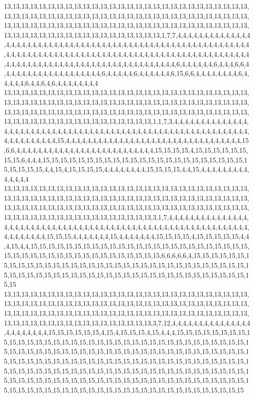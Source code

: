 13,13,13,13,13,13,13,13,13,13,13,13,13,13,13,13,13,13,13,13,13,13,13,13,13,13,13,13,13,13,13,13,13,13,13,13,13,13,13,13,13,13,13,13,13,13,13,13,13,13,13,13,13,13,13,13,13,13,13,13,13,13,13,13,13,13,13,13,13,13,13,13,13,13,13,13,13,13,13,13,13,13,13,13,13,13,13,13,13,13,13,13,13,13,13,13,13,13,13,13,13,13,1,7,7,4,4,4,4,4,4,4,4,4,4,4,4,4,4,4,4,4,4,4,4,4,4,4,4,4,4,4,4,4,4,4,4,4,4,4,4,4,4,4,4,4,4,4,4,4,4,4,4,4,4,4,4,4,4,4,4,4,4,4,4,4,4,4,4,4,4,4,4,4,4,4,4,4,4,4,4,4,4,4,4,4,4,4,4,4,4,4,4,4,4,4,4,4,4,4,4,4,4,4,4,4,4,4,4,4,4,4,4,4,4,4,4,4,4,4,4,4,4,4,4,4,4,4,4,4,4,4,4,4,4,4,4,4,4,4,4,4,4,6,4,4,4,4,4,4,6,4,4,4,6,6,4,4,4,4,4,4,4,4,4,4,4,4,4,4,4,4,4,4,4,6,4,4,4,4,4,6,4,4,4,4,4,4,6,15,6,6,4,4,4,4,4,4,4,4,6,4,4,4,4,4,6,4,4,6,4,6,4,4,4,4,4,4,4,4
13,13,13,13,13,13,13,13,13,13,13,13,13,13,13,13,13,13,13,13,13,13,13,13,13,13,13,13,13,13,13,13,13,13,13,13,13,13,13,13,13,13,13,13,13,13,13,13,13,13,13,13,13,13,13,13,13,13,13,13,13,13,13,13,13,13,13,13,13,13,13,13,13,13,13,13,13,13,13,13,13,13,13,13,13,13,13,13,13,13,13,13,13,13,13,13,13,13,13,13,13,1,1,7,3,4,4,4,4,4,4,4,4,4,4,4,4,4,4,4,4,4,4,4,4,4,4,4,4,4,4,4,4,4,4,4,4,4,4,4,4,4,4,4,4,4,4,4,4,4,4,4,4,4,4,4,4,4,4,4,4,4,4,4,4,4,4,4,4,4,4,4,4,4,4,15,4,4,4,4,4,4,4,4,4,4,4,4,4,4,4,4,4,4,4,4,4,4,4,4,4,4,4,4,4,4,4,4,4,15,6,6,4,4,4,4,4,4,4,4,4,4,4,4,4,4,4,4,4,4,4,4,4,4,4,4,4,4,15,15,15,15,4,15,15,15,15,15,15,15,15,6,4,4,4,15,15,15,15,15,15,15,15,15,15,15,15,15,15,15,15,15,15,15,15,15,15,15,15,15,15,15,15,4,4,15,4,15,15,15,15,4,4,4,4,4,4,4,4,15,15,15,15,4,4,15,4,4,4,4,4,4,4,4,4,4,4,4,4,4
13,13,13,13,13,13,13,13,13,13,13,13,13,13,13,13,13,13,13,13,13,13,13,13,13,13,13,13,13,13,13,13,13,13,13,13,13,13,13,13,13,13,13,13,13,13,13,13,13,13,13,13,13,13,13,13,13,13,13,13,13,13,13,13,13,13,13,13,13,13,13,13,13,13,13,13,13,13,13,13,13,13,13,13,13,13,13,13,13,13,13,13,13,13,13,13,13,13,13,13,13,3,1,7,4,4,4,4,4,4,4,4,4,4,4,4,4,4,4,4,4,4,4,4,4,4,4,4,4,4,4,4,4,4,4,4,4,4,4,4,4,4,4,4,4,4,4,4,4,4,4,4,4,4,4,4,4,4,4,4,4,4,4,4,4,4,4,4,4,4,4,4,4,15,15,15,4,4,4,4,4,4,4,15,4,4,4,4,4,4,4,15,15,15,15,4,15,15,15,15,15,4,4,4,15,4,4,15,15,15,15,15,15,15,15,15,15,15,15,15,15,15,15,15,15,15,15,15,15,15,15,15,15,15,15,15,15,15,15,15,15,15,15,15,15,15,15,15,15,15,6,6,6,6,6,4,15,15,15,15,15,15,15,15,15,15,15,15,15,15,15,15,15,15,15,15,15,15,15,15,15,15,15,15,15,15,15,15,15,15,15,15,15,15,15,15,15,15,15,15,15,15,15,15,15,15,15,15,15,15,15,15,15,15,15,15,15,15,15,15
13,13,13,13,13,13,13,13,13,13,13,13,13,13,13,13,13,13,13,13,13,13,13,13,13,13,13,13,13,13,13,13,13,13,13,13,13,13,13,13,13,13,13,13,13,13,13,13,13,13,13,13,13,13,13,13,13,13,13,13,13,13,13,13,13,13,13,13,13,13,13,13,13,13,13,13,13,13,13,13,13,13,13,13,13,13,13,13,13,13,13,13,13,13,13,13,13,13,13,13,13,3,7,12,4,4,4,4,4,4,4,4,4,4,4,4,4,4,4,4,4,4,4,4,4,4,4,15,15,15,15,15,15,4,15,4,15,15,15,4,15,4,4,4,15,15,15,15,15,15,15,15,15,15,15,15,15,15,15,15,15,15,15,15,15,15,15,15,15,15,15,15,15,15,15,15,15,15,15,15,15,15,15,15,15,15,15,15,15,15,15,15,15,15,15,15,15,15,15,15,15,15,15,15,15,15,15,15,15,15,15,15,15,15,15,15,15,15,15,15,15,15,15,15,15,15,15,15,15,15,15,15,15,15,15,15,15,15,15,15,15,15,15,15,15,15,15,15,15,15,15,15,15,15,15,15,15,15,15,15,15,15,15,15,15,15,15,15,15,15,15,15,15,15,15,15,15,15,15,15,15,15,15,15,15,15,15,15,15,15,15,15,15,15,15,15,15,15,15,15,15,15,15,15,15,15,15,15,15,15,15,15,15,15,15,15,15,15,15,15

